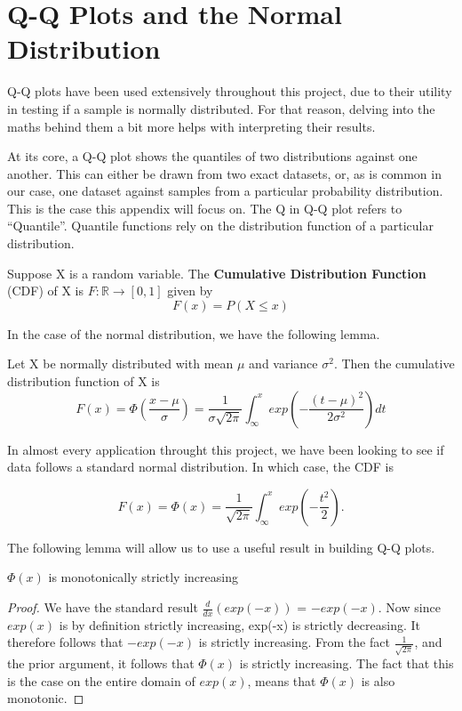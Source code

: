 \chapter{Q-Q Plots and the Normal Distribution}

Q-Q plots have been used extensively throughout this project, due to their utility in testing if a sample is normally distributed.
For that reason, delving into the maths behind them a bit more helps with interpreting their results. 

At its core, a Q-Q plot shows the quantiles of two distributions against one another. This can either be drawn from two exact datasets,
or, as is common in our case, one dataset against samples from a particular probability distribution. This is the case this appendix will focus on. 
The Q in Q-Q plot refers to ``Quantile''. Quantile functions rely on the distribution function of a particular distribution.

\begin{definition}
    Suppose X is a random variable. The \textbf{Cumulative Distribution Function} (CDF) of X is $F:\mathbb{R} \to [0,1] $ given by
    \[
        F(x) = P(X \leq x)  
    \]
\end{definition}

In the case of the normal distribution, we have the following lemma.

\begin{lemma}
    Let X be normally distributed with mean $\mu$ and variance $\sigma^2$. Then the cumulative distribution function of X is 
    \[
        F(x) = \Phi\left(\frac{x-\mu}{\sigma}\right) = \frac{1}{\sigma \sqrt{2 \pi}}\int_{\infty}^{x}exp\left( -\frac{(t-\mu)^2}{2\sigma^2} \right) dt
    \]
\end{lemma}

In almost every application throught this project, we have been looking to see if data follows a standard normal distribution. In which case, the
CDF is 

\[
    F(x) = \Phi(x) = \frac{1}{\sqrt{2\pi}}\int_{\infty}^{x}exp\left( -\frac{t^2}{2}\right).  
\]

The following lemma will allow us to use a useful result in building Q-Q plots.

\begin{lemma}
    $\Phi(x)$ is monotonically strictly increasing
\end{lemma}

\begin{proof}
    We have the standard result $\frac{d}{dx}\left(exp(-x)\right)$ = $-exp(-x)$. Now since $exp(x)$ is by definition strictly increasing, exp(-x) is strictly decreasing. It 
    therefore follows that $-exp(-x)$ is strictly increasing. From the fact $\frac{1}{\sqrt{2\pi}}$, and the prior argument, it follows that $\Phi(x)$ is strictly increasing.
    The fact that this is the case on the entire domain of $exp(x)$, means that $\Phi(x)$ is also monotonic. 
\end{proof}

